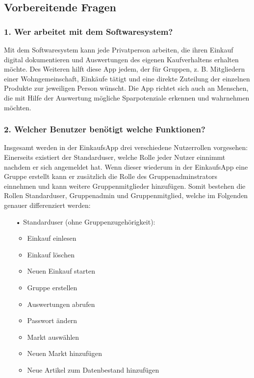 \documentclass[12pt,a4paper]{article}
\begin{document}
\newpage
\subsection{Vorbereitende Fragen}
\subsubsection*{1. Wer arbeitet mit dem Softwaresystem?}
Mit dem Softwaresystem kann jede Privatperson arbeiten, die ihren Einkauf digital dokumentieren und Auswertungen des eigenen Kaufverhaltens erhalten möchte. 
Des Weiteren hilft diese App jedem, der für Gruppen, z. B. Mitgliedern einer Wohngemeinschaft, Einkäufe tätigt und eine direkte Zuteilung der einzelnen Produkte zur jeweiligen Person wünscht. 
Die App richtet sich auch an Menschen, die mit Hilfe der Auswertung mögliche Sparpotenziale erkennen und wahrnehmen möchten. 
\subsubsection*{2. Welcher Benutzer benötigt welche Funktionen?}
Insgesamt werden in der EinkaufsApp drei verschiedene Nutzerrollen vorgesehen:
Einerseits existiert der Standarduser, welche Rolle jeder Nutzer einnimmt nachdem er sich angemeldet hat.
Wenn dieser wiederum in der EinkaufsApp eine Gruppe erstellt kann er zusätzlich die Rolle des Gruppenadminstrators einnehmen und kann weitere Gruppenmitglieder hinzufügen.
Somit bestehen die Rollen Standarduser, Gruppenadmin und Gruppenmitglied, welche im Folgenden genauer differenziert werden:
\begin{itemize}
\item[•]Standarduser (ohne Gruppenzugehörigkeit):
\begin{itemize}
\item Einkauf einlesen
\item Einkauf löschen
\item Neuen Einkauf starten
\item Gruppe erstellen
\item Auswertungen abrufen
\item Passwort ändern
\item Markt auswählen
\item Neuen Markt hinzufügen
\item Neue Artikel zum Datenbestand hinzufügen
\end{itemize}       
\end{itemize} 
\end{document}
